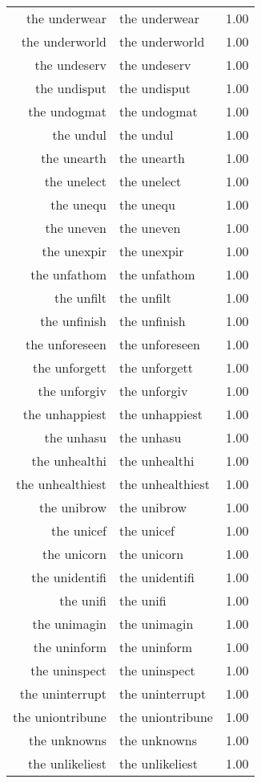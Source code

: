 \begin{table}[ht]
\begin{tabular}{rlr}
  the underwear & the underwear & 1.00 \\ 
  the underworld & the underworld & 1.00 \\ 
  the undeserv & the undeserv & 1.00 \\ 
  the undisput & the undisput & 1.00 \\ 
  the undogmat & the undogmat & 1.00 \\ 
  the undul & the undul & 1.00 \\ 
  the unearth & the unearth & 1.00 \\ 
  the unelect & the unelect & 1.00 \\ 
  the unequ & the unequ & 1.00 \\ 
  the uneven & the uneven & 1.00 \\ 
  the unexpir & the unexpir & 1.00 \\ 
  the unfathom & the unfathom & 1.00 \\ 
  the unfilt & the unfilt & 1.00 \\ 
  the unfinish & the unfinish & 1.00 \\ 
  the unforeseen & the unforeseen & 1.00 \\ 
  the unforgett & the unforgett & 1.00 \\ 
  the unforgiv & the unforgiv & 1.00 \\ 
  the unhappiest & the unhappiest & 1.00 \\ 
  the unhasu & the unhasu & 1.00 \\ 
  the unhealthi & the unhealthi & 1.00 \\ 
  the unhealthiest & the unhealthiest & 1.00 \\ 
  the unibrow & the unibrow & 1.00 \\ 
  the unicef & the unicef & 1.00 \\ 
  the unicorn & the unicorn & 1.00 \\ 
  the unidentifi & the unidentifi & 1.00 \\ 
  the unifi & the unifi & 1.00 \\ 
  the unimagin & the unimagin & 1.00 \\ 
  the uninform & the uninform & 1.00 \\ 
  the uninspect & the uninspect & 1.00 \\ 
  the uninterrupt & the uninterrupt & 1.00 \\ 
  the uniontribune & the uniontribune & 1.00 \\ 
  the unknowns & the unknowns & 1.00 \\ 
  the unlikeliest & the unlikeliest & 1.00 \\ 

\end{tabular}
\end{table}
